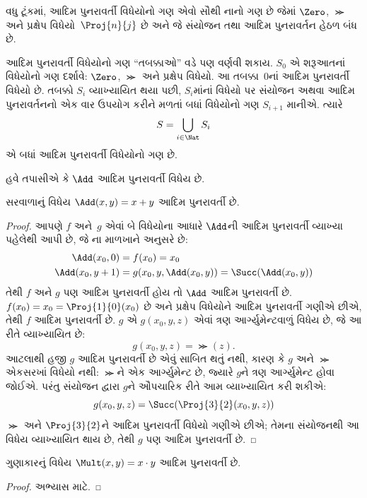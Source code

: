 \documentclass[../../../include/open-logic-section]{subfiles}
\begin{document}
\begin{explain}
વધુ ટૂંકમાં, આદિમ પુનરાવર્તી વિધેયોનો ગણ એવો સૌથી નાનો ગણ છે જેમાં
$\Zero$, $\Succ$ અને પ્રક્ષેપ વિધેયો~$\Proj{n}{j}$ છે અને જે
સંયોજન તથા આદિમ પુનરાવર્તન હેઠળ બંધ છે.

આદિમ પુનરાવર્તી વિધેયોનો ગણ ``તબક્કાઓ'' વડે પણ વર્ણવી શકાય. $S_0$
એ શરૂઆતનાં વિધેયોનો ગણ દર્શાવે: $\Zero$, $\Succ$ અને પ્રક્ષેપ
વિધેયો. આ તબક્કા~$0$નાં આદિમ પુનરાવર્તી વિધેયો છે. તબક્કો $S_i$
વ્યાખ્યાયિત થયા પછી, $S_i$માંનાં વિધેયો પર સંયોજન અથવા આદિમ
પુનરાવર્તનનો એક વાર ઉપયોગ કરીને મળતાં બધાં વિધેયોનો ગણ $S_{i+1}$
માનીએ. ત્યારે
\[
S = \bigcup_{i \in \Nat} S_i
\]
એ બધાં આદિમ પુનરાવર્તી વિધેયોનો ગણ છે.
\end{explain}

હવે તપાસીએ કે $\Add$ આદિમ પુનરાવર્તી વિધેય છે.

\begin{prop}
  સરવાળાનું વિધેય $\Add(x,y) = x+y$ આદિમ પુનરાવર્તી છે.
\end{prop}

\begin{proof}
આપણે $f$ અને~$g$ એવાં બે વિધેયોના આધારે $\Add$ની આદિમ પુનરાવર્તી
વ્યાખ્યા પહેલેથી આપી છે, જે ના
માળખાને અનુસરે છે:
\begin{align*}
  \Add(x_0, 0) & = f(x_0) = x_0\\
  \Add(x_0, y+1) & = g(x_0, y, \Add(x_0, y)) =
  \Succ(\Add(x_0, y))
\end{align*}
તેથી $f$ અને $g$ પણ આદિમ પુનરાવર્તી હોય તો $\Add$ આદિમ
પુનરાવર્તી છે. $f(x_0) = x_0 = \Proj{1}{0}(x_0)$ છે અને પ્રક્ષેપ
વિધેયોને આદિમ પુનરાવર્તી ગણીએ છીએ, તેથી $f$ આદિમ પુનરાવર્તી છે.
$g$ એ $g(x_0, y, z)$ એવાં ત્રણ આર્ગ્યુમેન્ટવાળું વિધેય છે, જે આ
રીતે વ્યાખ્યાયિત છે:
\[
g(x_0, y, z) = \Succ(z).
\]
આટલાથી હજી $g$ આદિમ પુનરાવર્તી છે એવું સાબિત થતું નથી, કારણ કે
$g$ અને $\Succ$ એકસરખાં વિધેયો નથી: $\Succ$ને એક આર્ગ્યુમેન્ટ છે,
જ્યારે $g$ને ત્રણ આર્ગ્યુમેન્ટ હોવા જોઈએ. પરંતુ સંયોજન દ્વારા
$g$ને ઔપચારિક રીતે આમ વ્યાખ્યાયિત કરી શકીએ:
\[
g(x_0, y, z) = \Succ(\Proj{3}{2}(x_0, y, z))
\]
$\Succ$ અને $\Proj{3}{2}$ને આદિમ પુનરાવર્તી વિધેયો ગણીએ છીએ;
તેમના સંયોજનથી આ વિધેય વ્યાખ્યાયિત થાય છે, તેથી $g$ પણ આદિમ
પુનરાવર્તી છે.
\end{proof}

\begin{prop}
  ગુણાકારનું વિધેય $\Mult(x,y) = x \cdot y$ આદિમ પુનરાવર્તી છે.
\end{prop}

\begin{proof}
  અભ્યાસ માટે.
\end{proof}
\end{document}
